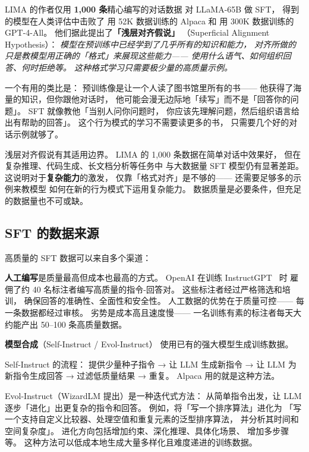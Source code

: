 LIMA 的作者仅用 \textbf{1,000 条}精心编写的对话数据
对 LLaMA-65B 做 SFT，
得到的模型在人类评估中击败了
用 52K 数据训练的 Alpaca 和
用 300K 数据训练的 GPT-4-All。
他们据此提出了\textbf{「浅层对齐假说」}
（Superficial Alignment Hypothesis）：
\emph{模型在预训练中已经学到了几乎所有的知识和能力，
对齐所做的只是教模型用正确的「格式」来展现这些能力——
使用什么语气、如何组织回答、何时拒绝等。
这种格式学习只需要极少量的高质量示例。}

一个有用的类比是：
预训练像是让一个人读了图书馆里所有的书——
他获得了海量的知识，但你跟他对话时，
他可能会漫无边际地「续写」而不是「回答你的问题」。
SFT 就像教他「当别人问你问题时，
你应该先理解问题，然后组织语言给出有帮助的回答」。
这个行为模式的学习不需要读更多的书，
只需要几个好的对话示例就够了。

\begin{warnbox}
浅层对齐假说有其适用边界。
LIMA 的 1,000 条数据在简单对话中效果好，
但在复杂推理、代码生成、长文档分析等任务中
与大数据量 SFT 模型仍有显著差距。
这说明对于\textbf{复杂能力}的激发，
仅靠「格式对齐」是不够的——
还需要足够多的示例来教模型
如何在新的行为模式下运用复杂能力。
数据质量是必要条件，但充足的数据量也不可或缺。
\end{warnbox}

\subsection{SFT 的数据来源}

高质量的 SFT 数据可以来自多个渠道：

\textbf{人工编写}是质量最高但成本也最高的方式。
OpenAI 在训练 InstructGPT~\cite{ouyang2022rlhf} 时
雇佣了约 40 名标注者编写高质量的指令-回答对。
这些标注者经过严格筛选和培训，
确保回答的准确性、全面性和安全性。
人工数据的优势在于质量可控——
每一条数据都经过审核。
劣势是成本高且速度慢——
一名训练有素的标注者每天大约能产出 50--100 条高质量数据。

\textbf{模型合成}（Self-Instruct / Evol-Instruct）
使用已有的强大模型生成训练数据。

Self-Instruct 的流程：
提供少量种子指令 → 让 LLM 生成新指令 →
让 LLM 为新指令生成回答 → 过滤低质量结果 → 重复。
Alpaca 用的就是这种方法。

Evol-Instruct（WizardLM 提出）是一种迭代式方法：
从简单指令出发，让 LLM 逐步「进化」出更复杂的指令和回答。
例如，将「写一个排序算法」进化为
「写一个支持自定义比较器、处理空值和重复元素的泛型排序算法，
并分析其时间和空间复杂度」。
进化方向包括增加约束、深化推理、具体化场景、
增加多步骤等。
这种方法可以低成本地生成大量多样化且难度递进的训练数据。

